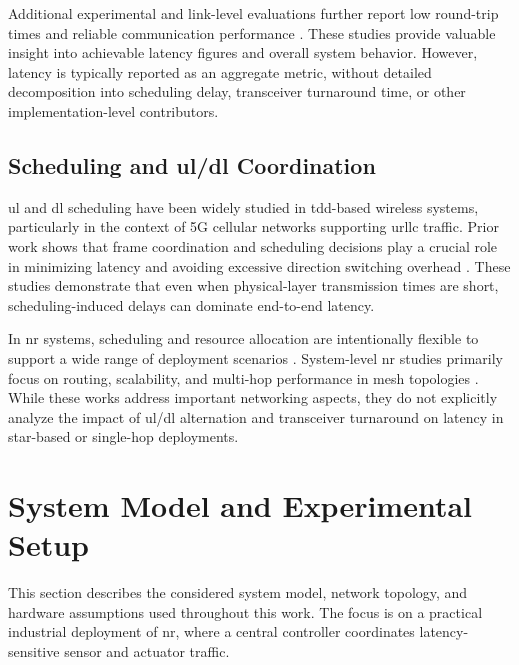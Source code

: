 \documentclass[conference]{IEEEtran}
\begin{document}
Additional experimental and link-level evaluations further report low round-trip times and reliable communication performance \cite{haqueDECT2020NRLink2025,maliatsosEvaluationIMT2020Candidate2022}. These studies provide valuable insight into achievable latency figures and overall system behavior. However, latency is typically reported as an aggregate metric, without detailed decomposition into scheduling delay, transceiver turnaround time, or other implementation-level contributors.


\subsection{Scheduling and \gls{ul}/\gls{dl} Coordination}

\gls{ul} and \gls{dl} scheduling have been widely studied in \gls{tdd}-based wireless systems, particularly in the context of 5G cellular networks supporting  \gls{urllc} traffic. Prior work shows that frame coordination and scheduling decisions play a crucial role in minimizing latency and avoiding excessive direction switching overhead \cite{esswieQuasiDynamicFrameCoordination2019}. These studies demonstrate that even when physical-layer transmission times are short, scheduling-induced delays can dominate end-to-end latency.

In \gls{nr} systems, scheduling and resource allocation are intentionally flexible to support a wide range of deployment scenarios \cite{TS1036364}. System-level \gls{nr} studies primarily focus on routing, scalability, and multi-hop performance in mesh topologies \cite{samuylovPerformanceMACLayer2024a,glazkovImprovingNearURLLCServices2025}. While these works address important networking aspects, they do not explicitly analyze the impact of \gls{ul}/\gls{dl} alternation and transceiver turnaround on latency in star-based or single-hop deployments.





\section{System Model and Experimental Setup}
This section describes the considered system model, network topology, and hardware assumptions used throughout this work. The focus is on a practical industrial deployment of \gls{nr}, where a central controller coordinates latency-sensitive sensor and actuator traffic.
\end{document}

